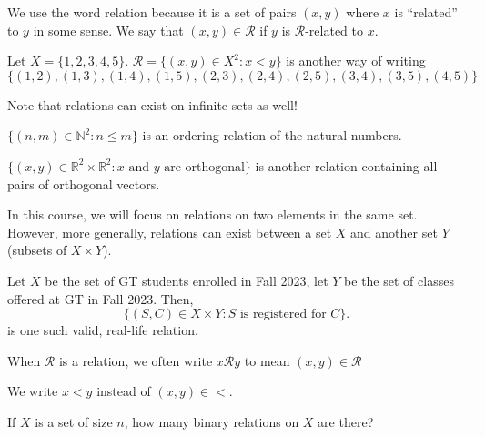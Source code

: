 \documentclass[a4paper]{article}
\begin{document}
We use the word relation because it is a set of pairs \( (x,y) \) where \( x \) is ``related'' to \( y \) in some sense. We say that \( (x,y) \in \mathcal{R} \) if \( y \) is \( \mathcal{R} \)-related to \( x \).

\begin{eg}
	Let \( X=\{1,2,3,4,5\}   \). \( \mathcal{R}=\{ (x,y) \in X^2 \colon x < y\} \) is another way of writing \( \{(1,2),(1,3),(1,4),(1,5),(2,3),(2,4),(2,5),(3,4),(3,5),(4,5)\}    \)
\end{eg}

Note that relations can exist on infinite sets as well!

\begin{eg}
	\( \{(n,m) \in \mathbb{N}^2 \colon n \le m\}   \) is an ordering relation of the natural numbers.
\end{eg}

\begin{eg}
	\( \{(x,y) \in \mathbb{R}^2 \times \mathbb{R}^2 \colon x \text{ and } y \text{ are orthogonal}\} \) is another relation containing all pairs of orthogonal vectors.
\end{eg}

\begin{remark}
	In this course, we will focus on relations on two elements in the same set. However, more generally, relations can exist between a set \( X \) and another set \( Y \) (subsets of \( X \times  Y \)).
\end{remark}

\begin{eg}
	Let \( X \) be the set of GT students enrolled in Fall 2023, let \( Y \) be the set of classes offered at GT in Fall 2023. Then, \[
		\{(S,C) \in X \times Y \colon S \text{ is registered for } C\}
	.\] is one such valid, real-life relation.
\end{eg}

\begin{notation}
	When \( \mathcal{R} \) is a relation, we often write \( x \mathcal{R}y \) to mean \( (x,y) \in \mathcal{R} \)
\end{notation}

\begin{eg}
	We write \( x < y \) instead of \( (x,y) \in < \).
\end{eg}

\begin{eg}
	If \( X \) is a set of size \( n \), how many binary relations on \( X \) are there?
\end{eg}
\end{document}
